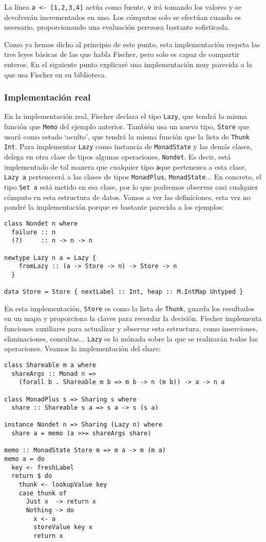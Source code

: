 \documentclass[class=article, crop=false]{standalone}
\begin{document}
La línea \verb`a <- [1,2,3,4]` actúa como fuente, \verb`v` irá tomando los valores y se
devolverán incrementados en uno. Los cómputos solo se efectúan cuando es necesario,
proporcionando una evaluación perezosa bastante sofisticada.

Como ya hemos dicho al principio de este punto, esta implementación respeta las tres leyes
básicas de las que habla Fischer, pero solo es capaz de compartir enteros. En el siguiente
punto explicaré una implementación muy parecida a la que usa Fischer en su biblioteca.

\subsubsection{Implementación real}
En la implementación real, Fischer declara el tipo \verb`Lazy`, que tendrá la misma función
que \verb`Memo` del ejemplo anterior. También usa un nuevo tipo, \verb`Store` que usará como
estado `oculto', que tendrá la misma función que la lista de \verb`Thunk Int`. Para
implementar \verb`Lazy` como instancia de \verb`MonadState` y las demás clases, delega en
otra clase de tipos algunas operaciones, \verb`Nondet`. Es decir, está implementado de tal
manera que cualquier tipo \verb`a`que pertenezca a esta clase, \verb`Lazy a` pertenecerá a
las clases de tipos \verb`MonadPlus`, \verb`MonadState`... En concreto, el tipo \verb`Set a`
está metido en esa clase, por lo que podremos observar casi cualquier cómputo en esta
estructura de datos. Vamos a ver las definiciones, esta vez no pondré la implementación
porque es bastante parecida a los ejemplos:

\begin{verbatim}
class Nondet n where
  failure :: n
  (?)     :: n -> n -> n

newtype Lazy n a = Lazy {
    fromLazy :: (a -> Store -> n) -> Store -> n
  }

data Store = Store { nextLabel :: Int, heap :: M.IntMap Untyped }
\end{verbatim}

En esta implementación, \verb`Store` es como la lista de \verb`Thunk`, guarda los resultados
en un mapa y proporciona la claves para recordar la decisión. Fischer implementa funciones
auxiliares para actualizar y observar esta estructura, como inserciones, eliminaciones,
consultas... \verb`Lazy` es la mónada sobre la que se realizarán todas las operaciones.
Veamos la implementación del share:

\begin{verbatim}
class Shareable m a where
  shareArgs :: Monad n =>
    (forall b . Shareable m b => m b -> n (m b)) -> a -> n a

class MonadPlus s => Sharing s where
  share :: Shareable s a => s a -> s (s a)

instance Nondet n => Sharing (Lazy n) where
  share a = memo (a >>= shareArgs share)

memo :: MonadState Store m => m a -> m (m a)
memo a = do
  key <- freshLabel
  return $ do
    thunk <- lookupValue key
    case thunk of
      Just x  -> return x
      Nothing -> do
        x <- a
        storeValue key x
        return x
\end{verbatim}
\end{document}
